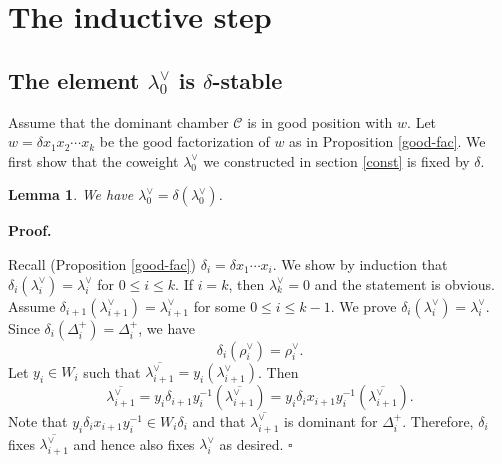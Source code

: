 \documentclass[10pt,leqno]{article}
\newtheorem{lemma}[equation]{Lemma}
\newcommand{\qed}{\hfill $\square$ \medskip}
\newenvironment{proof}[1][Proof]{\noindent\textbf{#1.} }{\qed}
\newcommand{\caC}{\mathcal C}
\renewcommand{\a}{\mathfrak a}
\renewcommand{\sec}[1]{\section{#1}
\renewcommand{\theequation}{\thesection.\arabic{equation}}
  \setcounter{equation}{0}}
\def\le{\leqslant}
\def\a{\alpha}
\def\d{\delta}
\def\l{\lambda}
\renewcommand{\sec}[1]{\section{#1}
\renewcommand{\theequation}{\thesection.\arabic{equation}}
  \setcounter{equation}{0}}
\begin{document}
\begin{comment}
Now one computes that $\l_1^\vee = \rho_1^\vee=(0, 3, 3, 5, 3, 0)$ and its dominant conjugate is $\overline{\l_1^\vee}=(3, 5, 6, 9, 6, 3)$. Note that $\rho^\vee=(8, 11, 15, 21, 15, 8)$. Then the full sequence gives
$$
t=\delta \exp(\frac{2\pi i}{6} \l_0)=\delta\exp(\frac{2\pi i}{6} (\rho^\vee + \overline{\l_1^\vee}))=\delta \exp(\frac{2\pi i}{6} (11, 16, 21, 30, 21, 11)).
$$
The partial sequence gives
$$
t'=\delta \exp(\frac{2\pi i}{3} \rho^\vee)=
\delta \exp(\frac{2\pi i}{6} (16, 22, 30, 42, 30, 16)).
$$
So $t \neq t'$. On the other hand, we have
\begin{gather*} t_1:=n(s_1 s_6) t n(s_1 s_6)^{-1} =\delta \exp(\frac{2\pi i}{6}(10, 16, 21, 30, 21, 10)); \\
t_2:=\a_3^\vee(-1) t_1 \a_3^\vee(-1)=\delta \exp(\frac{2\pi i}{6}(10, 16, 18, 30, 24, 10))=t'.
\end{gather*}
So $t$ is conjugate to $t'$.

\bigskip
\end{comment}

\sec{The inductive step}

\subsection{The element $\l_0^\vee$ is $\d$-stable}
Assume that the dominant chamber $\caC$ is in good position with
$w$. Let $w=\d x_1 x_2 \cdots x_k$ be the good factorization of $w$ as
in Proposition \ref{good-fac}. We first show that the coweight
$\l_0^\vee$ we constructed in section \ref{const} is fixed by $\d$.

\begin{lemma} \label{dom}
	We have $\l_0^\vee =\delta (\l_0^\vee)$.
\end{lemma}
\begin{proof}

  Recall (Proposition \ref{good-fac})  $\d_i=\delta x_1 \cdots x_{i}$. We show by induction that
  $\d_{i}(\l^\vee_{i})=\l^\vee_{i}$ for $0 \le i \le k$. If $i=k$,
  then $\l_k^\vee = 0$ and the statement is obvious. Assume
  $\d_{i+1}(\l_{i+1}^\vee) = \l_{i+1}^\vee$ for some
  $0 \le i \le k-1$. We prove $\d_i(\l_i^\vee)=\l_i^\vee$. Since
  $\d_{i}(\Delta_i^+)=\Delta_i^+$, we
  have $$\d_{i}(\rho_i^\vee)=\rho_i^\vee.$$ Let $y_i \in W_i$ such
  that $\overline{\l_{i+1}^\vee} =
  y_i(\l_{i+1}^\vee)$. Then
  $$\overline{\l_{i+1}^\vee}=y_i \d_{i+1} y_i^{-1}
  (\overline{\l_{i+1}^\vee}) =y_i \d_i x_{i+1} y_i^{-1}
  (\overline{\l_{i+1}^\vee}).$$ Note that
  $y_i \d_i x_{i+1} y_i^{-1} \in W_i\delta_i$ and that
  $\overline{\l_{i+1}^\vee}$ is dominant for $\Delta_i^+$. Therefore,
  $\d_i$ fixes $\overline{\l_{i+1}^\vee}$ and hence also fixes
  $\l_i^\vee$ as desired.
\end{proof}
\end{document}
